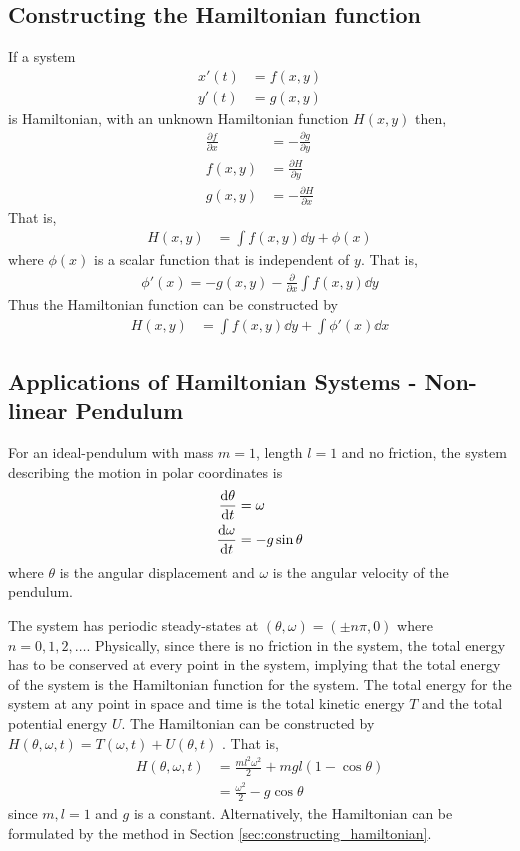 \documentclass[11pt,1in]{article}
\begin{document}
\subsection{Constructing the Hamiltonian function \label{sec:constructing_hamiltonian}}
If a system 
\begin{align}
x'(t) &= f(x,y) \\
y'(t) &= g(x,y)
\end{align}
is Hamiltonian, with an unknown Hamiltonian function $H(x,y)$ then, \cite[pp. 499]{diff_eq}
\begin{align}
\frac{\partial f}{\partial x} &= -\frac{\partial g}{\partial y}  \\
f(x,y) &= \frac{\partial H}{\partial y} \\
g(x,y) &=  - \frac{\partial H}{\partial x}
\end{align}
That is,
\begin{align}
H(x,y) &= \int f(x,y) \dd{y} + \phi(x)
\end{align}
where $\phi(x)$ is a scalar function that is independent of $y$. That is,
\begin{align}
\phi'(x) = - g ( x , y ) - \frac { \partial } { \partial x } \int f ( x , y ) \dd{y}
\end{align}
Thus the Hamiltonian function can be constructed by 
\begin{align}
H(x,y) &= \int f(x,y) \dd{y} + \int \phi'(x) \dd{x}
\end{align}
\subsection{Applications of Hamiltonian Systems - Non-linear Pendulum}
For an ideal-pendulum with mass $m = 1$, length $l = 1$ and no friction, the system describing the motion in polar coordinates is 
\begin{align}
\derivative{\theta}{t} &= \omega \\
\derivative{\omega}{t} &= -g \sin\theta
\end{align}  
where $\theta$ is the angular displacement and $\omega$ is the angular velocity of the pendulum. 

The system has periodic steady-states at $(\theta, \omega ) = (\pm n\pi , 0)$ where $n = 0,1,2,\ldots$. Physically, since there is no friction in the system, the total energy has to be conserved at every point in the system, implying that the total energy of the system is the Hamiltonian function for the system. The total energy for the system at any point in space and time is the total kinetic energy $T$ and the total potential energy $U$. The Hamiltonian can be constructed by $H(\theta, \omega, t) = T(\omega, t) + U(\theta, t)$ \cite{engr_math}. That is,
\begin{align}
H(\theta,\omega, t) &= \frac{m l^2 \omega^2}{2} + mgl(1 - \cos\theta) \\
&= \frac{\omega^2}{2} - g\cos\theta \label{eq:hamiltonian_pendulum}
\end{align}
since $m,l = 1$ and $g$ is a constant. Alternatively, the Hamiltonian can be formulated by the method in Section \ref{sec:constructing_hamiltonian}. 
\end{document}
